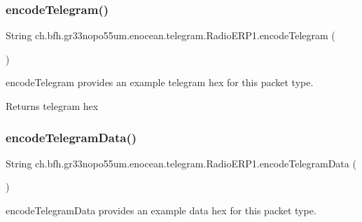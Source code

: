\hypertarget{classch_1_1bfh_1_1gr33nopo55um_1_1enocean_1_1telegram_1_1_radio_e_r_p1_a57f766be286585c2246368c8da69a6e5}{}\label{classch_1_1bfh_1_1gr33nopo55um_1_1enocean_1_1telegram_1_1_radio_e_r_p1_a57f766be286585c2246368c8da69a6e5} 
\subsubsection{\texorpdfstring{encode\+Telegram()}{encodeTelegram()}}
{\footnotesize\ttfamily String ch.\+bfh.\+gr33nopo55um.\+enocean.\+telegram.\+Radio\+E\+R\+P1.\+encode\+Telegram (\begin{DoxyParamCaption}{ }\end{DoxyParamCaption})}

encode\+Telegram provides an example telegram hex for this packet type.

\begin{DoxyReturn}{Returns}
telegram hex 
\end{DoxyReturn}
\hypertarget{classch_1_1bfh_1_1gr33nopo55um_1_1enocean_1_1telegram_1_1_radio_e_r_p1_ac3eaf30bab4d3aeed647ca881cca3330}{}\label{classch_1_1bfh_1_1gr33nopo55um_1_1enocean_1_1telegram_1_1_radio_e_r_p1_ac3eaf30bab4d3aeed647ca881cca3330} 
\subsubsection{\texorpdfstring{encode\+Telegram\+Data()}{encodeTelegramData()}}
{\footnotesize\ttfamily String ch.\+bfh.\+gr33nopo55um.\+enocean.\+telegram.\+Radio\+E\+R\+P1.\+encode\+Telegram\+Data (\begin{DoxyParamCaption}{ }\end{DoxyParamCaption})}

encode\+Telegram\+Data provides an example data hex for this packet type.

